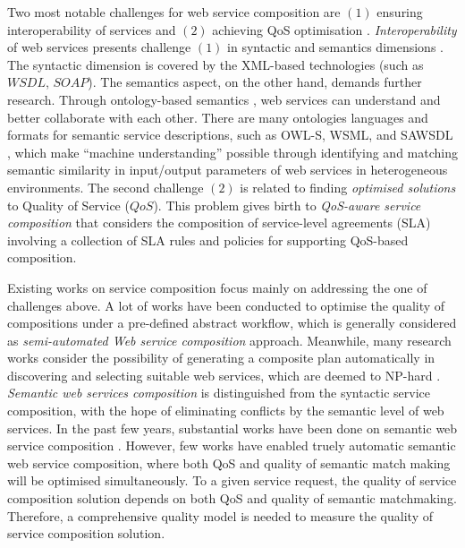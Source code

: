 \documentclass{IEEEtran}
\begin{document}
Two most notable challenges for web service composition are $(1)$ ensuring interoperability of services and $(2)$ achieving QoS optimisation \cite{fensel2011semantic}. \textit{Interoperability} of web services presents challenge $(1)$ in syntactic and semantics dimensions \cite{fensel2011semantic}. The syntactic dimension is covered by the XML-based technologies (such as $WSDL$, $SOAP$). The semantics aspect, on the other hand, demands further research. Through ontology-based semantics \cite{o2005review}, web services can understand and better collaborate with each other. There are many ontologies languages and formats for semantic service descriptions, such as OWL-S, WSML, and SAWSDL \cite{petrie2016web}, which make ``machine understanding'' possible through identifying and matching semantic similarity in input/output parameters of web services in heterogeneous environments. The second challenge $(2)$ is related to finding \textit{optimised solutions} to Quality of Service ($QoS$). This problem gives birth to \textit{QoS-aware service composition} that considers the composition of service-level agreements (SLA) \cite {sahai2002automated} involving a collection of SLA rules and policies for supporting QoS-based composition.

Existing works on service composition focus mainly on addressing the one of challenges above. A lot of works have been conducted to optimise the quality of compositions under a pre-defined abstract workflow, which is generally considered as \textit{semi-automated Web service composition} approach. Meanwhile, many research works consider the possibility of generating a composite plan automatically in discovering and selecting suitable web services, which are deemed to NP-hard \cite{moghaddam2014service}. \textit{Semantic web services composition} is distinguished from the syntactic service composition, with the hope of eliminating conflicts by the semantic level of web services. In the past few years, substantial works have been done on semantic web service composition \cite{fensel2011semantic,lecue2009optimizing}. However, few works have enabled truely automatic semantic web service composition, where both QoS and quality of semantic match making will be optimised simultaneously. To a given service request, the quality of service composition solution depends on both QoS and quality of semantic matchmaking. Therefore, a comprehensive quality model is needed to measure the quality of service composition solution.
\end{document}
